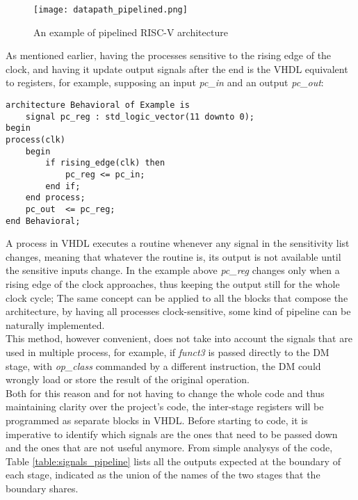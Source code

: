 \begin{figure}[!ht]
    \centering
    \texttt{[image: datapath\_pipelined.png]}
    \caption{An example of pipelined RISC-V architecture}
    \label{fig:DP_PPL}
\end{figure}

As mentioned earlier, having the processes sensitive to the rising edge of the clock, and having it update output signals after the end is the VHDL equivalent to registers, for example, supposing an input \emph{pc{\_}in} and an output \emph{pc{\_}out}:  

\begin{verbatim}
architecture Behavioral of Example is
    signal pc_reg : std_logic_vector(11 downto 0);
begin
process(clk)
    begin
        if rising_edge(clk) then
            pc_reg <= pc_in;
        end if;
    end process;
    pc_out  <= pc_reg;
end Behavioral;
\end{verbatim}

A process in VHDL executes a routine whenever any signal in the sensitivity list changes, meaning that whatever the routine is, its output is not available until the sensitive inputs change. In the example above \emph{pc{\_}reg} changes only when a rising edge of the clock approaches, thus keeping the output still for the whole clock cycle; The same concept can be applied to all the blocks that compose the architecture, by having all processes clock-sensitive, some kind of pipeline can be naturally implemented.\\
This method, however convenient, does not take into account the signals that are used in multiple process, for example, if \emph{funct3} is passed directly to the DM stage, with \emph{op{\_}class} commanded by a different instruction, the DM could wrongly load or store the result of the original operation.\\
Both for this reason and for not having to change the whole code and thus maintaining clarity over the project's code, the inter-stage registers will be programmed as separate blocks in VHDL. Before starting to code, it is imperative to identify which signals are the ones that need to be passed down and the ones that are not useful anymore. 
From simple analysys of the code, Table \ref{table:signals_pipeline} lists all the outputs expected at the boundary of each stage, indicated as the union of the names of the two stages that the boundary shares.

